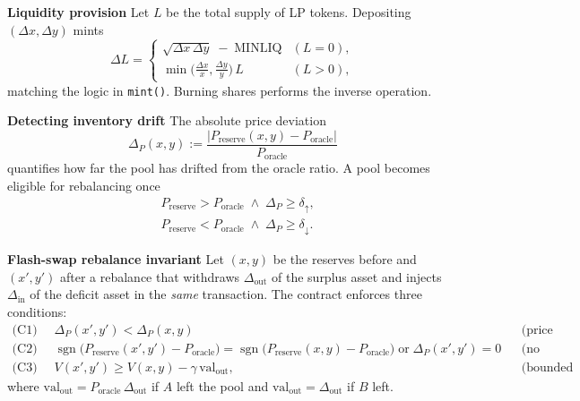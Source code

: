 \documentclass[a4paper]{article}
\providecommand{\hyp}{-}
\theoremstyle{definition}
\begin{document}
\medskip\noindent\textbf{Liquidity provision}
Let $L$ be the total supply of LP tokens.  Depositing $(\Delta x,\Delta y)$
mints
\begin{equation}
  \Delta L =
  \begin{cases}
    \sqrt{\Delta x\,\Delta y}\; - \;\text{MINLIQ} & (L=0),\\[4pt]
    \min\bigl(\tfrac{\Delta x}{x},\tfrac{\Delta y}{y}\bigr)\,L & (L>0),
  \end{cases}\label{eq:mint}
\end{equation}
matching the logic in \texttt{mint()}.  Burning shares performs the inverse
operation.

\medskip\noindent\textbf{Detecting inventory drift}
The absolute price deviation
\begin{equation}
  \Delta_P(x,y) := \frac{|P_{\mathrm{reserve}}(x,y)-P_{\mathrm{oracle}}|}{P_{\mathrm{oracle}}}
\end{equation}
quantifies how far the pool has drifted from the oracle ratio.  A pool becomes
eligible for rebalancing once
\begin{align}
  &P_{\mathrm{reserve}} > P_{\mathrm{oracle}} \;\wedge\; \Delta_P \ge \delta_{\uparrow},\label{eq:reb_up}\\
  &P_{\mathrm{reserve}} < P_{\mathrm{oracle}} \;\wedge\; \Delta_P \ge \delta_{\downarrow}.\label{eq:reb_down}
\end{align}

\medskip\noindent\textbf{Flash\hyp swap rebalance invariant}
Let $(x,y)$ be the reserves before and $(x',y')$ after a rebalance that
withdraws $\Delta_{\text{out}}$ of the surplus asset and injects
$\Delta_{\text{in}}$ of the deficit asset in the \emph{same} transaction.  The
contract enforces three conditions:
\begin{align}
  \text{(C1)}\;&\; \Delta_P(x',y') < \Delta_P(x,y) & &\text{(price improves)}\label{eq:c1}\\
  \text{(C2)}\;&\; \operatorname{sgn}\bigl(P_{\mathrm{reserve}}(x',y')-P_{\mathrm{oracle}}\bigr) = \operatorname{sgn}\bigl(P_{\mathrm{reserve}}(x,y)-P_{\mathrm{oracle}}\bigr)\;\text{or}\;\Delta_P(x',y')=0 & &\text{(no overshoot)}\label{eq:c2}\\
  \text{(C3)}\;&\; V(x',y') \ge V(x,y) - \gamma\,\mathrm{val}_{\text{out}}, & &\text{(bounded loss)}\label{eq:c3}
\end{align}
where $\mathrm{val}_{\text{out}} = P_{\mathrm{oracle}}\,\Delta_{\text{out}}$ if
$A$ left the pool and $\mathrm{val}_{\text{out}} = \Delta_{\text{out}}$ if $B$
left.
\end{document}
